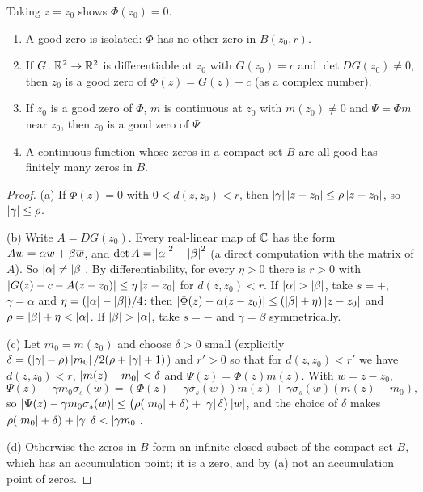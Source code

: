 
Taking $z=z_0$ shows $\Phi(z_0)=0$.

\begin{lemma}\label{lem:good-zero}
\leavevmode
\begin{enumerate}[label=(\alph*)]
\item A good zero is isolated: $\Phi$ has no other zero in $B(z_0,r)$.
\item If $G\colon\mathbb{R}^2\to\mathbb{R}^2$ is differentiable at $z_0$ with $G(z_0)=c$ and $\det DG(z_0)\neq0$,
then $z_0$ is a good zero of $\Phi(z)=G(z)-c$ (as a complex number).
\item If $z_0$ is a good zero of $\Phi$, $m$ is continuous at $z_0$ with $m(z_0)\neq0$ and
$\Psi=\Phi m$ near $z_0$, then $z_0$ is a good zero of $\Psi$.
\item A continuous function whose zeros in a compact set $B$ are all good has finitely many zeros
in $B$.
\end{enumerate}
\end{lemma}

\begin{proof}
(a) If $\Phi(z)=0$ with $0<d(z,z_0)<r$, then $\left\lvert \gamma\right\rvert\left\lvert z-z_0\right\rvert\le\rho\left\lvert z-z_0\right\rvert$, so
$\left\lvert \gamma\right\rvert\le\rho$.

(b) Write $A=DG(z_0)$. Every real-linear map of $\mathbb{C}$ has the form $Aw=\alpha w+\beta\overline{w}$, and
$\det A=\left\lvert \alpha\right\rvert^2-\left\lvert \beta\right\rvert^2$ (a direct computation with the matrix of $A$). So
$\left\lvert \alpha\right\rvert\neq\left\lvert \beta\right\rvert$. By differentiability, for every $\eta>0$ there is $r>0$ with
$\left\lvert G(z)-c-A(z-z_0)\right\rvert\le\eta\left\lvert z-z_0\right\rvert$ for $d(z,z_0)<r$. If $\left\lvert \alpha\right\rvert>\left\lvert \beta\right\rvert$, take $s=+$,
$\gamma=\alpha$ and $\eta=(\left\lvert \alpha\right\rvert-\left\lvert \beta\right\rvert)/4$: then
$\left\lvert \Phi(z)-\alpha(z-z_0)\right\rvert\le(\left\lvert \beta\right\rvert+\eta)\left\lvert z-z_0\right\rvert$ and $\rho=\left\lvert \beta\right\rvert+\eta<\left\lvert \alpha\right\rvert$. If
$\left\lvert \beta\right\rvert>\left\lvert \alpha\right\rvert$, take $s=-$ and $\gamma=\beta$ symmetrically.

(c) Let $m_0=m(z_0)$ and choose $\delta>0$ small (explicitly
$\delta=(\left\lvert \gamma\right\rvert-\rho)\left\lvert m_0\right\rvert/2(\rho+\left\lvert \gamma\right\rvert+1)$) and $r'>0$ so that for $d(z,z_0)<r'$ we
have $d(z,z_0)<r$, $\left\lvert m(z)-m_0\right\rvert<\delta$ and $\Psi(z)=\Phi(z)m(z)$. With $w=z-z_0$,
\[
\Psi(z)-\gamma m_0\sigma_s(w)=(\Phi(z)-\gamma\sigma_s(w))m(z)+\gamma\sigma_s(w)(m(z)-m_0),
\]
so $\left\lvert \Psi(z)-\gamma m_0\sigma_s(w)\right\rvert\le\big(\rho(\left\lvert m_0\right\rvert+\delta)+\left\lvert \gamma\right\rvert\delta\big)\left\lvert w\right\rvert$, and
the choice of $\delta$ makes $\rho(\left\lvert m_0\right\rvert+\delta)+\left\lvert \gamma\right\rvert\delta<\left\lvert \gamma m_0\right\rvert$.

(d) Otherwise the zeros in $B$ form an infinite closed subset of the compact set $B$, which has an
accumulation point; it is a zero, and by (a) not an accumulation point of zeros.
\end{proof}

